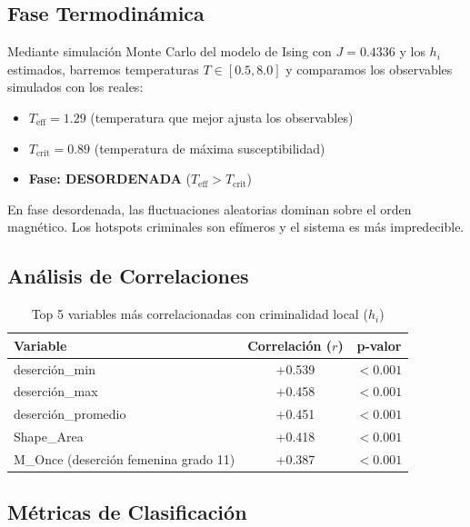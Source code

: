 \documentclass[12pt,a4paper]{article}
\begin{document}
\subsection{Fase Termodinámica}

Mediante simulación Monte Carlo del modelo de Ising con $J=0.4336$ y los $h_i$ estimados, barremos temperaturas $T \in [0.5, 8.0]$ y comparamos los observables simulados con los reales:

\begin{itemize}
    \item $T_{\text{eff}} = 1.29$ (temperatura que mejor ajusta los observables)
    \item $T_{\text{crit}} = 0.89$ (temperatura de máxima susceptibilidad)
    \item \textbf{Fase: DESORDENADA} ($T_{\text{eff}} > T_{\text{crit}}$)
\end{itemize}

En fase desordenada, las fluctuaciones aleatorias dominan sobre el orden magnético. Los hotspots criminales son efímeros y el sistema es más impredecible.

\subsection{Análisis de Correlaciones}

\begin{table}[H]
\centering
\caption{Top 5 variables más correlacionadas con criminalidad local ($h_i$)}
\label{tab:correlaciones}
\begin{tabular}{@{}lcc@{}}
\toprule
\textbf{Variable} & \textbf{Correlación ($r$)} & \textbf{p-valor} \\
\midrule
deserción\_min & +0.539 & $<0.001$ \\
deserción\_max & +0.458 & $<0.001$ \\
deserción\_promedio & +0.451 & $<0.001$ \\
Shape\_Area & +0.418 & $<0.001$ \\
M\_Once (deserción femenina grado 11) & +0.387 & $<0.001$ \\
\bottomrule
\end{tabular}
\end{table}

\subsection{Métricas de Clasificación}
\end{document}
